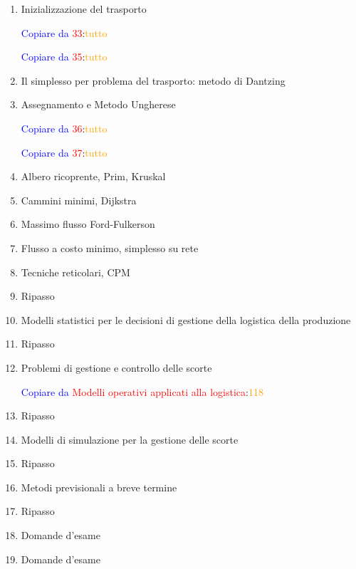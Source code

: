 \documentclass[a4paper,10pt]{article}
\newcommand{\copiare}[2]{%
  \begin{flushright}
  \textcolor{blue}{Copiare da }\textcolor{red}{#1}:\textcolor{orange}{#2}    
  \end{flushright}%
}
\begin{document}
\begin{enumerate}
 \copiare{Modelli operativi applicati alla logistica}{203}
 \item Inizializzazione del trasporto \copiare{33}{tutto}
	\copiare{35}{tutto}
 \item Il simplesso per problema del trasporto: metodo di Dantzing
 \item Assegnamento e Metodo Ungherese \copiare{36}{tutto} \copiare{37}{tutto}
 \item Albero ricoprente, Prim, Kruskal
 \item Cammini minimi, Dijkstra
 \item Massimo flusso Ford-Fulkerson
 \item Flusso a costo minimo, simplesso su rete
 \item Tecniche reticolari, CPM
 \item Ripasso
 
 \item Modelli statistici per le decisioni di gestione della logistica della produzione
 \item Ripasso
 \item Problemi di gestione e controllo delle scorte \copiare{Modelli operativi applicati alla logistica}{118}
 \item Ripasso
 \item Modelli di simulazione per la gestione delle scorte
 \item Ripasso
 \item Metodi previsionali a breve termine
 \item Ripasso
 \item Domande d'esame
 \item Domande d'esame

\end{enumerate}

\begin{thebibliography}{9}


\end{thebibliography}
\end{document}
